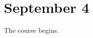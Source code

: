 \documentclass[../notes.tex]{subfiles}
\begin{document}
\section{September 4}
The course begins.
\end{document}
